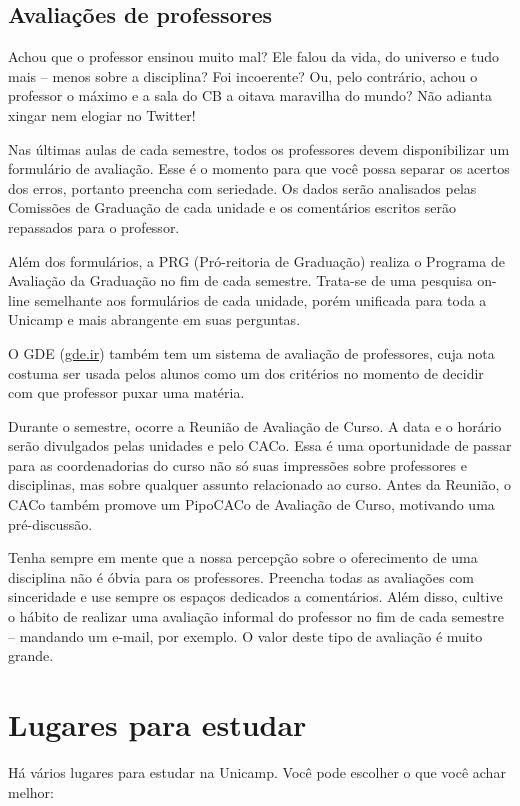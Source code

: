 \subsection{Avaliações de professores}

Achou que o professor ensinou muito mal? Ele falou da vida, do universo e tudo
mais -- menos sobre a disciplina? Foi incoerente? Ou, pelo contrário, achou o
professor o máximo e a sala do CB a oitava maravilha do mundo? Não adianta
xingar nem elogiar no Twitter!

Nas últimas aulas de cada semestre, todos os professores devem disponibilizar um
formulário de avaliação. Esse é o momento para que você possa separar os acertos
dos erros, portanto preencha com seriedade. Os dados serão analisados pelas
Comissões de Graduação de cada unidade e os comentários escritos serão repassados
para o professor.

Além dos formulários, a PRG (Pró-reitoria de Graduação) realiza o Programa de
Avaliação da Graduação no fim de cada semestre. Trata-se de uma pesquisa on-line
semelhante aos formulários de cada unidade, porém unificada para toda a Unicamp
e mais abrangente em suas perguntas.

O GDE (\url{gde.ir}) também tem um sistema de avaliação de professores, cuja nota
costuma ser usada pelos alunos como um dos critérios no momento de decidir com
que professor puxar uma matéria.

Durante o semestre, ocorre a Reunião de Avaliação de Curso. A data e o horário
serão divulgados pelas unidades e pelo CACo. Essa é uma oportunidade de passar
para as coordenadorias do curso não só suas impressões sobre professores e disciplinas,
mas sobre qualquer assunto relacionado ao curso. Antes da Reunião, o CACo também
promove um PipoCACo de Avaliação de Curso, motivando uma pré-discussão.

Tenha sempre em mente que a nossa percepção sobre o oferecimento de uma disciplina
não é óbvia para os professores. Preencha todas as avaliações com sinceridade
e use sempre os espaços dedicados a comentários. Além disso, cultive o hábito de
realizar uma avaliação informal do professor no fim de cada semestre -- mandando
um e-mail, por exemplo. O valor deste tipo de avaliação é muito grande.

\newpage
\section{Lugares para estudar}

Há vários lugares para estudar na Unicamp. Você pode escolher o que você achar
melhor:

